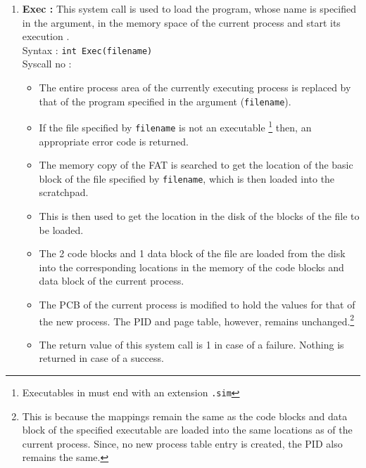 \begin{enumerate}
	\item  \textbf{Exec :}  This system call is used to load the program, whose name is specified in the argument, in the memory space of the current process and start its execution .\\
	Syntax : \texttt{int Exec(filename)} \\
	Syscall no : 
	\begin{itemize}
		\item The entire process area of the currently executing process is replaced by that of the program specified in the argument (\texttt{filename}). 
		\item If the file specified by \texttt{filename} is not an executable \footnote{Executables in {\ESIM} must end with an extension \texttt{.sim}} then, an appropriate error code is returned.
		\item The memory copy of the FAT  is searched to get the location of the basic block of the file specified by \texttt{filename}, which is then loaded into the scratchpad.
		\item This is then used to get the location in the disk of the blocks of the file to be loaded.
		\item The 2 code blocks and 1 data block of the file are loaded from the disk into the corresponding locations in the memory of the code blocks and data block of the current process.
		\item The PCB of the current process is modified to hold the values for that of the new process. The PID and page table, however, remains unchanged.\footnote{This is because the mappings remain the same as the code blocks and data block of the specified executable are loaded into the same locations as of the current process. Since, no new process table entry is created, the PID also remains the same.}
		\item The return value of this system call is 1 in case of a failure. Nothing is returned in case of a success.
	\end{itemize}
\end{enumerate}

